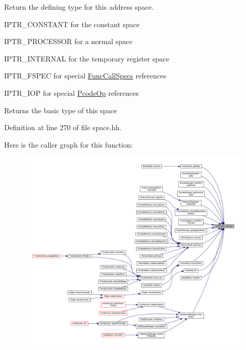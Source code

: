 Return the defining type for this address space.
\begin{DoxyItemize}
\item I\+P\+T\+R\+\_\+\+C\+O\+N\+S\+T\+A\+NT for the constant space
\item I\+P\+T\+R\+\_\+\+P\+R\+O\+C\+E\+S\+S\+OR for a normal space
\item I\+P\+T\+R\+\_\+\+I\+N\+T\+E\+R\+N\+AL for the temporary register space
\item I\+P\+T\+R\+\_\+\+F\+S\+P\+EC for special \mbox{\hyperlink{class_func_call_specs}{Func\+Call\+Specs}} references
\item I\+P\+T\+R\+\_\+\+I\+OP for special \mbox{\hyperlink{class_pcode_op}{Pcode\+Op}} references \begin{DoxyReturn}{Returns}
the basic type of this space 
\end{DoxyReturn}

\end{DoxyItemize}

Definition at line 270 of file space.\+hh.

Here is the caller graph for this function\+:
\nopagebreak
\begin{figure}[H]
\begin{center}
\leavevmode
\includegraphics[width=350pt]{class_addr_space_ab548f4158529a29122d4d0a30d94ed98_icgraph}
\end{center}
\end{figure}
\mbox{\label{class_addr_space_ab84baa41a0b25735578129031fef550c}} 
